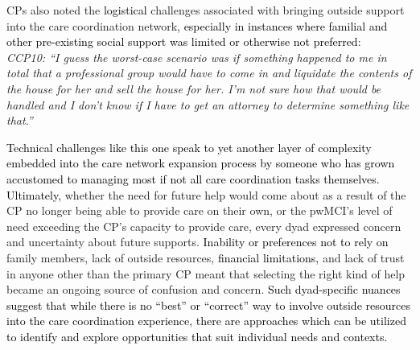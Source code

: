 \documentclass[acmsmall]{acmart}
\begin{document}
CPs also noted the \textcolor{black}{logistical} challenges associated with bringing outside support into the care coordination network\textcolor{black}{, especially in instances where familial and other pre-existing social support was limited or otherwise not preferred}:
\\

\textit{CCP10: “I guess the worst-case scenario was if something happened to me in total that a professional group would have to come in and liquidate the contents of the house for her and sell the house for her. I'm not sure how that would be handled and I don't know if I have to get an attorney to determine something like that.”}
\\

\textcolor{black}{Technical challenges like this one speak to yet another layer of complexity embedded into the care network expansion process by someone who has grown accustomed to managing most if not all care coordination tasks themselves. Ultimately,} whether the need for future help would come about as a result of the CP no longer being able to provide care on their own, or the pwMCI’s level of need exceeding the CP’s capacity to provide care, every dyad expressed concern and uncertainty about future supports. \textcolor{black}{Inability or preferences not to rely on} family members, lack of outside resources, \textcolor{black}{financial limitations,} and lack of trust in anyone other than the primary CP meant that selecting the right kind of help became an ongoing source of confusion and concern. \textcolor{black}{Such dyad-specific nuances suggest that while there is no “best” or “correct” way to involve outside resources into the care coordination experience, there are approaches which can be utilized to identify and explore opportunities that suit individual needs and contexts.}
\end{document}
